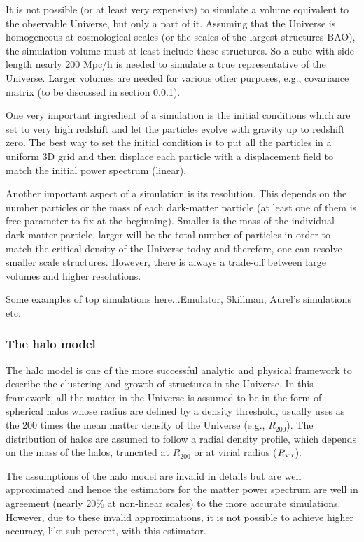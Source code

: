 It is not possible (or at least very expensive) to simulate a volume equivalent to the
observable Universe, but only a part of it. Assuming that the Universe is homogeneous
at cosmological scales (or the scales of the largest structures BAO), the simulation
volume must at least include these structures. So a cube with side length nearly 200 Mpc/h
is needed to simulate a true representative of the Universe. Larger volumes are needed
for various other purposes, e.g., covariance matrix (to be discussed in section \ref{}).

One very important ingredient of a simulation is the initial conditions which are
set to very high redshift and let the particles evolve with gravity up to redshift zero. 
The best way to set the initial condition is to put all the particles in a uniform 3D grid
and then displace each particle with a displacement field to match the initial power 
spectrum (linear). 

Another important aspect of a simulation is its resolution. This depends on the number 
particles or the mass of each dark-matter particle (at least one of them is free parameter 
to fix at the beginning). Smaller is the mass of the individual dark-matter particle, 
larger will be the total number of particles in order to match the critical density of 
the Universe today and therefore, one can resolve smaller scale structures. However, 
there is always a trade-off between large volumes and higher resolutions. 

Some examples of top simulations here...Emulator, Skillman, Aurel's simulations etc. 



\subsubsection{The halo model}

The halo model is one of the more successful analytic and physical framework to describe
the clustering and growth of structures in the Universe. In this framework, all the matter
in the Universe is assumed to be in the form of spherical halos whose radius are defined by a 
density threshold, usually uses as the 200 times the mean matter density of the Universe 
(e.g., $R_{200}$). The  distribution of halos are assumed to follow a radial density 
profile, which depends on the mass of the halos, truncated at $R_{200}$ or at virial 
radius ($R_{\rm vir}$).

The assumptions of the halo model are invalid in details but are well approximated and 
hence the estimators for the matter power spectrum are well in agreement 
(nearly 20$\%$ at non-linear scales)
to the more accurate simulations. However, due to these invalid approximations, it is not
possible to achieve higher accuracy, like sub-percent, with this estimator. 

